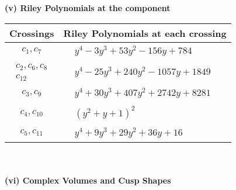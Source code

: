 \documentclass[1p]{elsarticle_modified}
\theoremstyle{definition}
\begin{document}
\newpage\renewcommand{\arraystretch}{1}
\flushleft \textbf{(v) Riley Polynomials at the component}\newline \\
\begin{tabular}{m{50pt}|m{274pt}}
Crossings & \hspace{64pt}Riley Polynomials at each crossing \\
\hline $$\begin{aligned}c_{1},c_{7}\end{aligned}$$&$\begin{aligned}
&y^4-3 y^3+53 y^2-156 y+784
\end{aligned}$\\
\hline $$\begin{aligned}c_{2},c_{6},c_{8}\\c_{12}\end{aligned}$$&$\begin{aligned}
&y^4-25 y^3+240 y^2-1057 y+1849
\end{aligned}$\\
\hline $$\begin{aligned}c_{3},c_{9}\end{aligned}$$&$\begin{aligned}
&y^4+30 y^3+407 y^2+2742 y+8281
\end{aligned}$\\
\hline $$\begin{aligned}c_{4},c_{10}\end{aligned}$$&$\begin{aligned}
&(y^2+y+1)^2
\end{aligned}$\\
\hline $$\begin{aligned}c_{5},c_{11}\end{aligned}$$&$\begin{aligned}
&y^4+9 y^3+29 y^2+36 y+16
\end{aligned}$\\
\hline
\end{tabular}\\~\\
\newpage\flushleft \textbf{(vi) Complex Volumes and Cusp Shapes}
\end{document}
